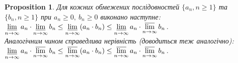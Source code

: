 \documentclass[a4paper, 14pt]{article}
\theoremstyle{theoremdd}
\theoremstyle{theoremdd}
\theoremstyle{theoremdd}
\theoremstyle{theoremdd}
\theoremstyle{theoremdd}
\newtheorem{proposition}[theorem]{Proposition}
\theoremstyle{theoremdd}
\theoremstyle{theoremdd}
\theoremstyle{theoremdd}
\begin{document}
	\begin{proposition}
	Для кожних обмежених послідовностей $\{a_n, n \geq 1 \}$ та $\{b_n, n \geq 1 \}$ при $a_n \geq 0,\ b_n \geq 0$ виконано наступне:\\
	$\displaystyle\varliminf_{n \to \infty} a_n \cdot \varliminf_{n \to \infty} b_n \leq \varliminf_{n \to \infty} (a_n \cdot b_n) \leq \varliminf_{n \to \infty} a_n \cdot \varlimsup_{n \to \infty} b_n$.\\
	Аналогічним чином справедлива нерівність (доводиться теж аналогічно):\\
	$\displaystyle\varliminf_{n \to \infty} a_n \cdot \varlimsup_{n \to \infty} b_n \leq \varlimsup_{n \to \infty} (a_n \cdot b_n) \leq \varlimsup_{n \to \infty} a_n \cdot \varlimsup_{n \to \infty} b_n$.
	\end{proposition}
	
\end{document}
